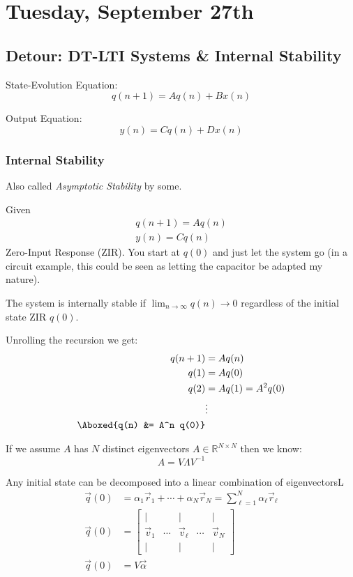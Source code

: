 \section{Tuesday, September 27th}
\subsection{Detour: DT-LTI Systems \& Internal Stability}
State-Evolution Equation:
\[
    q(n+1) = A q(n) + B x(n)
\]

Output Equation:
\[
    y(n) = C q(n) + D x(n)
\]

\subsubsection{Internal Stability}
Also called \textit{Asymptotic Stability} by some.

Given
\begin{align*}
    q(n+1) = A q(n)
    \\
    y(n)=Cq(n)
\end{align*}
Zero-Input Response (ZIR). You start at $q(0)$ and just let the system go (in a circuit example, this could be seen as letting the capacitor be adapted my nature).

\begin{shaded}
The system is internally stable if $\displaystyle\lim_{n\to\infty}q(n)\to0$ regardless of the initial state ZIR $q(0)$.
\end{shaded}

Unrolling the recursion we get:
\begin{align*}
    q(n+1) &= A q(n)
    \\
    q(1) &= A q(0)
    \\
    q(2) &= A q(1) = A^2 q(0)
    \\
    &\vdots
    \\
    \Aboxed{q(n) &= A^n q(0)}
\end{align*}

If we assume $A$ has $N$ distinct eigenvectors $A\in\mathbb R^{N\times N}$ then we know:
\[
    A = V\Lambda V^{-1}
\]

Any initial state can be decomposed into a linear combination of eigenvectorsL
\begin{align*}
    \vec q(0) 
    &= \alpha_1 \vec r_1 + \cdots + \alpha_N \vec r_N = \sum_{\ell=1}^N \alpha_\ell \vec r_\ell
    \\
    \vec q(0) 
    &= \begin{bmatrix}
        | & & | & & | \\
        \vec v_1 & \cdots & \vec v_\ell & \cdots & \vec v_N \\
        | & & | & & |
    \end{bmatrix}
    \\
    \vec q(0) 
    &= V\vec \alpha
\end{align*}

